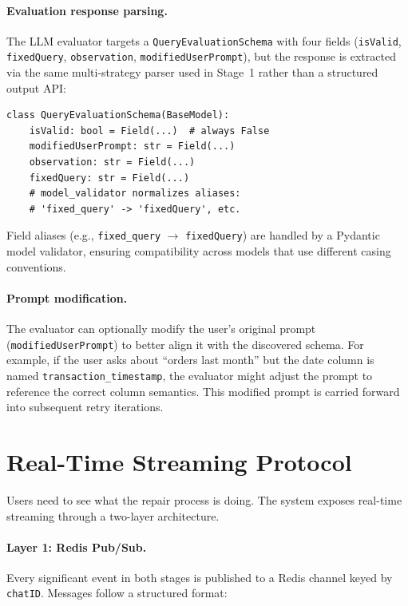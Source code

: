 \documentclass{article}
\begin{document}
\paragraph{Evaluation response parsing.} The LLM evaluator targets a \texttt{QueryEvaluationSchema} with four fields (\texttt{isValid}, \texttt{fixedQuery}, \texttt{observation}, \texttt{modifiedUserPrompt}), but the response is extracted via the same multi-strategy parser used in Stage~1 rather than a structured output API:

\begin{lstlisting}[style=pythonstyle, caption={Evaluation schema with alias normalization. The \texttt{isValid} field is always \texttt{False} by design.}]
class QueryEvaluationSchema(BaseModel):
    isValid: bool = Field(...)  # always False
    modifiedUserPrompt: str = Field(...)
    observation: str = Field(...)
    fixedQuery: str = Field(...)
    # model_validator normalizes aliases:
    # 'fixed_query' -> 'fixedQuery', etc.
\end{lstlisting}

Field aliases (e.g., \texttt{fixed\_query} $\to$ \texttt{fixedQuery}) are handled by a Pydantic model validator, ensuring compatibility across models that use different casing conventions.

\paragraph{Prompt modification.} The evaluator can optionally modify the user's original prompt (\texttt{modifiedUserPrompt}) to better align it with the discovered schema. For example, if the user asks about ``orders last month'' but the date column is named \texttt{transaction\_timestamp}, the evaluator might adjust the prompt to reference the correct column semantics. This modified prompt is carried forward into subsequent retry iterations.


\section{Real-Time Streaming Protocol}
\label{sec:streaming}

Users need to see what the repair process is doing. The system exposes real-time streaming through a two-layer architecture.

\paragraph{Layer 1: Redis Pub/Sub.} Every significant event in both stages is published to a Redis channel keyed by \texttt{chatID}. Messages follow a structured format:
\end{document}
